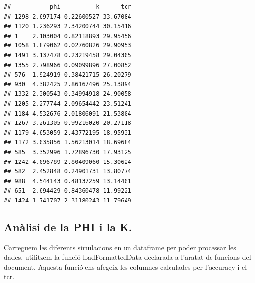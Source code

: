 \documentclass[]{article}
\newenvironment{Shaded}{\begin{snugshade}}{\end{snugshade}}
\newcommand{\KeywordTok}[1]{\textcolor[rgb]{0.13,0.29,0.53}{\textbf{#1}}}
\newcommand{\NormalTok}[1]{#1}
\newcommand{\OperatorTok}[1]{\textcolor[rgb]{0.81,0.36,0.00}{\textbf{#1}}}
\newcommand{\StringTok}[1]{\textcolor[rgb]{0.31,0.60,0.02}{#1}}
\begin{document}
\begin{verbatim}
##           phi          k      tcr
## 1298 2.697174 0.22600527 33.67084
## 1120 1.236293 2.34200744 30.15416
## 1    2.103004 0.82118893 29.95456
## 1058 1.879062 0.02760826 29.90953
## 1491 3.137478 0.23219458 29.04305
## 1355 2.798966 0.09099896 27.00852
## 576  1.924919 0.38421715 26.20279
## 930  4.382425 2.86167496 25.13894
## 1332 2.300543 0.34994918 24.90058
## 1205 2.277744 2.09654442 23.51241
## 1184 4.532676 2.01806091 21.53804
## 1267 3.261305 0.99216020 20.27118
## 1179 4.653059 2.43772195 18.95931
## 1172 3.035856 1.56213014 18.69684
## 585  3.352996 1.72896730 17.93125
## 1242 4.096789 2.80409060 15.30624
## 582  2.452848 0.24901731 13.80774
## 988  4.544143 0.48137259 13.14401
## 651  2.694429 0.84360478 11.99221
## 1424 1.741707 2.31180243 11.79649
\end{verbatim}

\hypertarget{analisi-de-la-phi-i-la-k.}{%
\subsection{Anàlisi de la PHI i la K.}\label{analisi-de-la-phi-i-la-k.}}

Carreguem les diferents simulacions en un dataframe per poder processar
les dades, utilitzem la funció loadFormattedData declarada a l'aratat de
funcions del document. Aquesta funció ens afegeix les columnes
calculades per l'accuracy i el tcr.

\begin{Shaded}
\end{Shaded}
\end{document}
